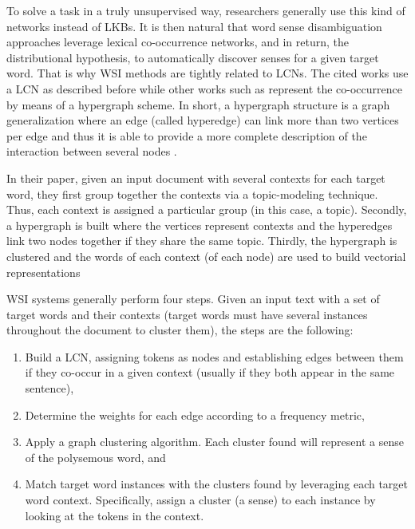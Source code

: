 To solve a task in a truly unsupervised way, researchers generally use this kind of networks instead of LKBs. It is then natural that word sense disambiguation approaches leverage lexical co-occurrence networks, and in return, the distributional hypothesis, to automatically discover senses for a given target word. That is why WSI methods \cite{2004.Veronis,2007.Klapaftis.UOY,2010.Navigli.InducingWordSenses.Triangles,2008.Klapaftis.WSIUsingCollocations,2011.DiMarco.Navigli.ClusteringWebSearch,2011.Jurgens.WSICommunityDetection} are tightly related to LCNs. 
The cited works use a LCN as described before while other works such as \cite{2007.Navigli.GraphConnectivity,2014.Tao.Qian.LexicalChainHypergraphWSI} represent the co-occurrence by means of a hypergraph scheme. In short, a hypergraph structure is a graph generalization where an edge (called hyperedge) can link more than two vertices per edge and thus it is able to provide a more complete description of the interaction between several nodes \cite{estrada2005}.

In their paper, given an input document with several contexts for each target word, they first group together the contexts via a topic-modeling technique. Thus, each context is assigned a particular group (in this case, a topic). Secondly, a hypergraph is built where the vertices represent contexts and the hyperedges link two nodes together if they share the same topic. Thirdly, the hypergraph is clustered and the words of each context (of each node) are used to build vectorial representations

WSI systems generally perform four steps. Given an input text with a set of target words and their contexts (target words must have several instances throughout the document to cluster them), the steps are the following:

\begin{enumerate}
\item Build a LCN, assigning tokens as nodes and  establishing edges between them if they co-occur in a given context (usually if they both appear in the same sentence),
\item Determine the weights for each edge according to a frequency metric,
\item Apply a graph clustering algorithm. Each cluster found will represent a sense of the polysemous word, and
\item Match  target word instances with the clusters found by leveraging each target word context. Specifically, assign a cluster (a sense) to each instance by looking at the tokens in the context.
\end{enumerate}

